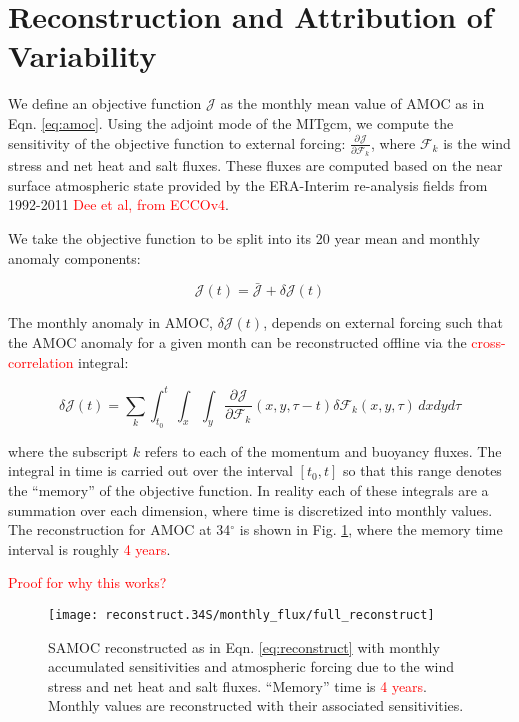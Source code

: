 \documentclass[a4paper,11pt]{article}
\newcommand{\pderiv}[3][]{%
  \ensuremath{\frac{\partial^{#1} {#2}}{\partial {#3}^{#1}}}}
\newcommand{\red}[1]{\textcolor{red}{#1}}
\begin{document}
  \section{Reconstruction and Attribution of Variability}
  \label{reconstruction}
  
  We define an objective function $\mathcal{J}$ as the monthly mean value of AMOC as in Eqn. \ref{eq:amoc}. Using the adjoint mode of the MITgcm, we compute the sensitivity of the objective function to external forcing: $\pderiv{\mathcal{J}}{\mathcal{F}_k}$, where $\mathcal{F}_k$ is the wind stress and net heat and salt fluxes. These fluxes are computed based on the near surface atmospheric state provided by the ERA-Interim re-analysis fields from 1992-2011 \red{Dee et al, from ECCOv4}. 
	
  We take the objective function to be split into its 20 year mean and monthly anomaly components: 

	\begin{equation}
	  \mathcal{J}(t) = \bar{\mathcal{J}} + \delta\mathcal{J}(t) 
	\end{equation}

  The monthly anomaly in AMOC, $\delta\mathcal{J}(t)$, depends on external forcing such that the AMOC anomaly for a given month can be reconstructed offline via the \red{cross-correlation} integral:
 
	\begin{equation}
	  \delta\mathcal{J}(t) = \sum_k\int_{t_0}^{t}\int_x \int_y\pderiv{\mathcal{J}}{\mathcal{F}_k}(x,y,\tau-t)\delta\mathcal{F}_k(x,y,\tau)\, dxdyd\tau  
	  \label{eq:reconstruct}
	\end{equation}

  where the subscript $k$ refers to each of the momentum and buoyancy fluxes. The integral in time is carried out over the interval $[t_0, t]$ so that this range denotes the ``memory'' of the objective function. In reality each of these integrals are a summation over each dimension, where time is discretized into monthly values. The reconstruction for AMOC at 34$^{\circ}$ is shown in Fig. \ref{fig:fullReconstruction}, where the memory time interval is roughly \red{4 years}.
 
  \red{Proof for why this works?}  

   \begin{figure}
    \centering
    \texttt{[image: reconstruct.34S/monthly\_flux/full\_reconstruct]}
    \caption{SAMOC reconstructed as in Eqn. \ref{eq:reconstruct} with monthly accumulated sensitivities and atmospheric forcing due to the wind stress and net heat and salt fluxes. ``Memory'' time is \red{4 years}. Monthly values are reconstructed with their associated sensitivities.}
    \label{fig:fullReconstruction}
   \end{figure}
\end{document}
